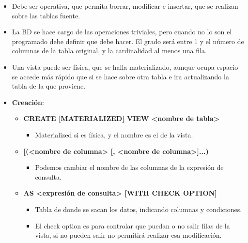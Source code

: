 \documentclass[12pt, twoside, openright]{report} %
\begin{document}
  \begin{itemize}
  \item Debe ser operativa, que permita borrar, modificar e insertar, que se
    realizan sobre las tablas fuente.
    
  \item La BD se hace cargo de las operaciones triviales, pero cuando no lo
    son el programado debe definir que debe hacer. El grado será entre 1
    y el número de columnas de la tabla original, y la cardinalidad al
    menos una fila.
    
  \item Una vista puede ser física, que se halla materializado, aunque ocupa
    espacio se accede más rápido que si se hace sobre otra tabla e ira
    actualizando la tabla de la que proviene.
    
  \item \textbf{Creación}:
    

    \begin{itemize}
    \item \textbf{CREATE {[}MATERIALIZED{]} VIEW \textless nombre de
      tabla\textgreater{}}
      

      \begin{itemize}
      \item Materialized si es física, y el nombre es el de la vista.
        
      \end{itemize}
    \item \textbf{{[}(\textless nombre de columna\textgreater{} {[},
      \textless nombre de columna\textgreater{]}...)}
      

      \begin{itemize}
      \item Podemos cambiar el nombre de las columnas de la expresión de
        consulta.
        
      \end{itemize}
    \item \textbf{AS \textless expresión de consulta\textgreater{} {[}WITH
      CHECK OPTION{]}}
      

      \begin{itemize}
      \item Tabla de donde se sacan los datos, indicando columnas y
        condiciones.
        
      \item El check option es para controlar que puedan o no salir filas de
        la vista, si no pueden salir no permitirá realizar esa
        modificación.
        
      \end{itemize}
    \end{itemize}
  \end{itemize}
\end{document}
